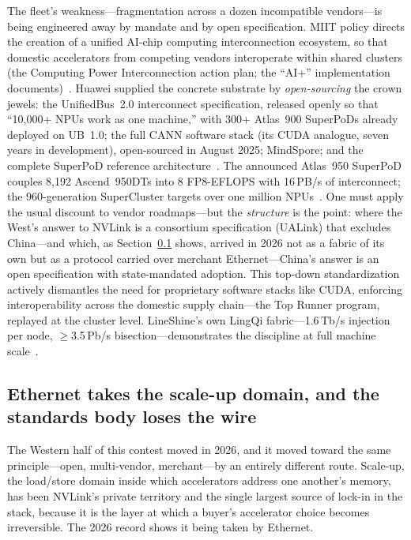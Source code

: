 The fleet's weakness---fragmentation across a dozen incompatible vendors---is being engineered away by mandate and by open specification. MIIT policy directs the creation of a unified AI-chip computing interconnection ecosystem, so that domestic accelerators from competing vendors interoperate within shared clusters (the Computing Power Interconnection action plan; the ``AI+'' implementation documents)~\cite{miit-interconnect}. Huawei supplied the concrete substrate by \emph{open-sourcing} the crown jewels: the UnifiedBus~2.0 interconnect specification, released openly so that ``10,000+ NPUs work as one machine,'' with 300+ Atlas~900 SuperPoDs already deployed on UB~1.0; the full CANN software stack (its CUDA analogue, seven years in development), open-sourced in August 2025; MindSpore; and the complete SuperPoD reference architecture~\cite{huawei-ub,huawei-cann}. The announced Atlas~950 SuperPoD couples 8,192 Ascend~950DTs into 8 FP8-EFLOPS with 16\,PB/s of interconnect; the 960-generation SuperCluster targets over one million NPUs~\cite{huawei-roadmap}. One must apply the usual discount to vendor roadmaps---but the \emph{structure} is the point: where the West's answer to NVLink is a consortium specification (UALink) that excludes China---and which, as Section~\ref{sec:scaleup} shows, arrived in 2026 not as a fabric of its own but as a protocol carried over merchant Ethernet---China's answer is an open specification with state-mandated adoption. This top-down standardization actively dismantles the need for proprietary software stacks like CUDA, enforcing interoperability across the domestic supply chain---the Top Runner program, replayed at the cluster level. LineShine's own LingQi fabric---1.6\,Tb/s injection per node, $\ge$3.5\,Pb/s bisection---demonstrates the discipline at full machine scale~\cite{dongarra-report}.

\subsection{Ethernet takes the scale-up domain, and the standards body loses the wire}
\label{sec:scaleup}

The Western half of this contest moved in 2026, and it moved toward the same principle---open, multi-vendor, merchant---by an entirely different route. Scale-up, the load/store domain inside which accelerators address one another's memory, has been NVLink's private territory and the single largest source of lock-in in the stack, because it is the layer at which a buyer's accelerator choice becomes irreversible. The 2026 record shows it being taken by Ethernet.

